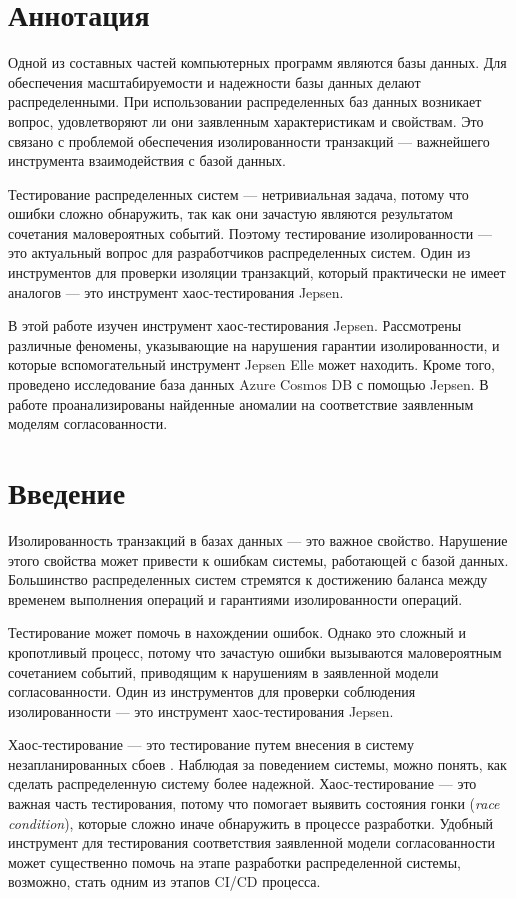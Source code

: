 \documentclass[12pt,  openany]{book}
\begin{document}
\chapter{Аннотация}

\par Одной из составных частей компьютерных программ являются базы данных. Для обеспечения масштабируемости и надежности базы данных делают распределенными. При использовании распределенных баз данных возникает вопрос, удовлетворяют ли они заявленным характеристикам и свойствам. Это связано с проблемой обеспечения изолированности транзакций --- важнейшего инструмента взаимодействия с базой данных.
\par Тестирование распределенных систем --- нетривиальная задача, потому что ошибки сложно обнаружить, так как они зачастую являются результатом сочетания маловероятных событий. Поэтому тестирование изолированности --- это актуальный вопрос для разработчиков распределенных систем. Один из инструментов для проверки изоляции транзакций, который практически не имеет аналогов --- это инструмент хаос-тестирования Jepsen.
\par В этой работе изучен инструмент хаос-тестирования Jepsen.  Рассмотрены различные феномены, указывающие на нарушения гарантии изолированности, и которые вспомогательный инструмент Jepsen Elle может находить. Кроме того, проведено исследование база данных Azure Cosmos DB с помощью Jepsen.  В работе проанализированы найденные аномалии на соответствие заявленным моделям согласованности.

\setcounter{page}{2}
\tableofcontents
\clearpage

\chapter{Введение}

Изолированность транзакций в базах данных --- это важное свойство. Нарушение этого свойства может привести к ошибкам системы, работающей с базой данных.  Большинство распределенных систем стремятся к достижению баланса между временем выполнения операций и гарантиями изолированности операций. 
\par Тестирование может помочь в нахождении ошибок. Однако это сложный и кропотливый процесс, потому что зачастую ошибки вызываются маловероятным сочетанием событий, приводящим к нарушениям в заявленной модели согласованности. Один из инструментов для проверки соблюдения изолированности --- это инструмент хаос-тестирования Jepsen.   
\par Хаос-тестирование --- это тестирование путем внесения в систему незапланированных сбоев \cite{chaosTesting}.  Наблюдая за поведением системы, можно понять, как сделать распределенную систему более надежной. Хаос-тестирование --- это важная часть тестирования, потому что помогает выявить состояния гонки (\textit{race condition}), которые сложно иначе обнаружить в процессе разработки. Удобный инструмент для тестирования соответствия заявленной модели согласованности может существенно помочь на этапе разработки распределенной системы, возможно, стать одним из этапов CI/CD процесса.
\end{document}
